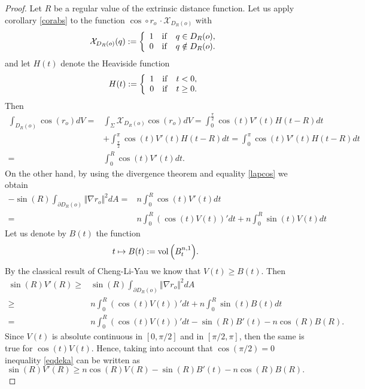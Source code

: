 \documentclass{amsart}
\theoremstyle{definition}
\theoremstyle{remark}
\begin{document}
\begin{proof}Let $R$ be a regular value of the extrinsic distance function. 
Let us apply corollary \ref{corabs} to the function $\cos\circ r_o\, \cdot \mathcal{X}_{D_R(o)}$ with
$$
\mathcal{X}_{D_R(o)}(q):=\left\lbrace \begin{array}{lcr}
1 & {\rm if}& q\in D_R(o),\\
0 & {\rm if}& q \notin D_R(o).
\end{array}
\right.
$$
and let $H(t)$ denote the Heaviside function
$$
H(t):=\left\lbrace \begin{array}{lcr}
1 & {\rm if}& t<0,\\
0 & {\rm if}& t\geq 0.
\end{array}
\right.
$$
Then 
$$
\begin{aligned}
\int_{D_R(o)} \cos(r_o)dV=& \int_{\Sigma} \mathcal{X}_{D_R(o)} \cos(r_o)dV=\int_0^\frac{\pi}{2}\cos(t)V'(t)H(t-R)dt \\& +\int_\frac{\pi}{2}^\pi\cos(t)V'(t)H(t-R)dt
=\int_0^\pi\cos(t)V'(t)H(t-R)dt\\=&\int_0^R\cos(t)V'(t)dt.
\end{aligned}
$$
On the other hand, by using the divergence theorem and equality \eqref{lapcos} we obtain
$$
\begin{aligned}
-\sin(R)\int_{\partial D_R(o)} \Vert \nabla r_o\Vert^2dA=&n\int_0^R\cos(t)V'(t)dt\\
=&n\int_0^R\left(\cos(t)V(t)\right)'dt+n\int_0^R\sin(t)V(t)dt
\end{aligned}
$$
Let us denote by $B(t)$ the function
$$
t\mapsto B(t):={{\rm vol}\left(B^{n,1}_t\right)}.
$$
By the classical result of Cheng-Li-Yau we know that $V(t)\geq B(t)$. Then
\begin{equation}\label{eqdeka}
\begin{aligned}
\sin(R)V'(R)\geq& \sin(R)\int_{\partial D_R(o)} \Vert \nabla r_o\Vert^2dA
\\\geq& n\int_0^R\left(\cos(t)V(t)\right)'dt+n\int_0^R\sin(t)B(t)dt\\
=& n\int_0^R\left(\cos(t)V(t)\right)'dt-\sin(R)B'(t)-n\cos(R)B(R).
\end{aligned}    
\end{equation}
Since $V(t)$ is absolute continuous in $[0,\pi/2]$ and in $[\pi/2,\pi]$, then the same is true for $\cos(t)V(t)$.  Hence, taking into account that $\cos(\pi/2)=0$ inequality \eqref{eqdeka} can be written as
\begin{equation}
\sin(R)V'(R)\geq   n\cos(R)V(R)-\sin(R)B'(t)-n\cos(R)B(R).
\end{equation}

\end{proof}
\end{document}

